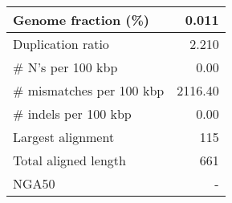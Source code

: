 \documentclass[12pt,a4paper]{article}
\begin{document}
\begin{table}[ht]
\begin{center}
\begin{tabular}{|l*{1}{|r}|}
Genome fraction (\%) & 0.011 \\ \hline
Duplication ratio & 2.210 \\ \hline
\# N's per 100 kbp & 0.00 \\ \hline
\# mismatches per 100 kbp & 2116.40 \\ \hline
\# indels per 100 kbp & 0.00 \\ \hline
Largest alignment & 115 \\ \hline
Total aligned length & 661 \\ \hline
NGA50 & - \\ \hline
\end{tabular}
\end{center}
\end{table}
\end{document}
